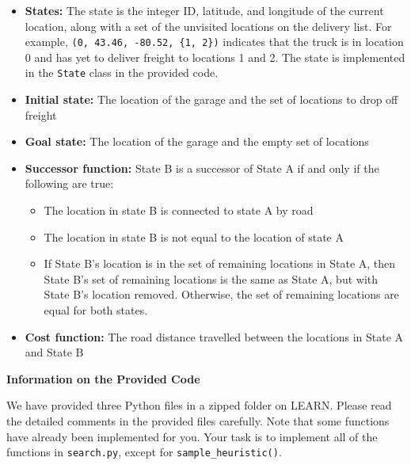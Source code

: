 \documentclass[12pt]{article}
\begin{document}
\begin{itemize}
    \item 
    \textbf{States:} The state is the integer ID, latitude, and longitude of the current location, along with a set of the unvisited locations on the delivery list. For example, \texttt{(0,~43.46,~-80.52,~\{1,~2\})} indicates that the truck is in location 0 and has yet to deliver freight to locations 1 and 2. The state is implemented in the \texttt{State} class in the provided code.
    \item
    \textbf{Initial state:} The location of the garage and the set of locations to drop off freight
    \item
    \textbf{Goal state:} The location of the garage and the empty set of locations
    \item
    \textbf{Successor function:} State B is a successor of State A if and only if the following are true:
    \begin{itemize}
        \item The location in state B is connected to state A by road
        \item The location in state B is not equal to the location of state A
        \item If State B's location is in the set of remaining locations in State A, then State B's set of remaining locations is the same as State A, but with State B's location removed. Otherwise, the set of remaining locations are equal for both states.
    \end{itemize}
    \item
    \textbf{Cost function:} The road distance travelled between the locations in State A and State B
\end{itemize}


{\bf Information on the Provided Code}

We have provided three Python files in a zipped folder on LEARN. Please read the detailed comments in the provided files carefully. Note that some functions have already been implemented for you. Your task is to implement all of the functions in \texttt{search.py}, except for \texttt{sample\_heuristic()}.
\end{document}
